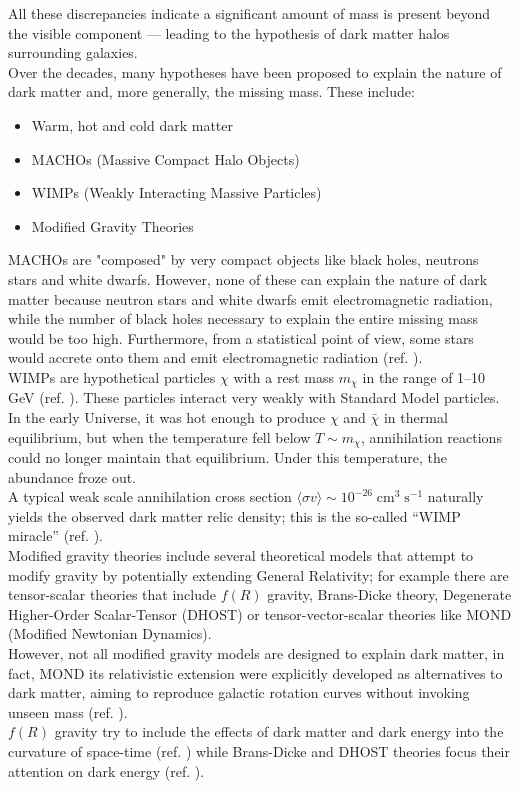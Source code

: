 All these discrepancies indicate a significant amount of mass is present beyond the visible component — leading to the hypothesis of dark matter halos surrounding galaxies.\\
Over the decades, many hypotheses have been proposed to explain the nature of dark matter and, more generally, the missing mass. These include:
\begin{itemize}
    \item Warm, hot and cold dark matter
    \item MACHOs (Massive Compact Halo Objects)
    \item WIMPs (Weakly Interacting Massive Particles)
    \item Modified Gravity Theories
\end{itemize}

MACHOs are "composed" by very compact objects like black holes, neutrons stars and white dwarfs. However, none of these can explain the nature of dark matter because neutron stars and white dwarfs emit electromagnetic radiation, while the number of black holes necessary to explain the entire missing mass would be too high. Furthermore, from a statistical point of view, some stars would accrete onto them and emit electromagnetic radiation (ref. \cite{Astrophysics-in-a-Nutshell}).\\
WIMPs are hypothetical particles $\chi$ with a rest mass $m_\chi$ in the range of 1–10 GeV (ref. \cite{Longair}). These particles interact very weakly with Standard Model particles. In the early Universe, it was hot enough to produce $\chi$ and $\bar\chi$ in thermal equilibrium, but when the temperature fell below $T \sim m_\chi$, annihilation reactions could no longer maintain that equilibrium. Under this temperature, the abundance froze out.\\ A typical weak scale annihilation cross section $\langle \sigma v\rangle \sim 10^{-26} \; \text{cm}^3 \; \text{s}^{-1}$ naturally yields the observed dark matter relic density; this is the so-called “WIMP miracle” (ref. \cite{2024darkmatter}).\\
Modified gravity theories include several theoretical models that attempt to modify gravity by potentially extending General Relativity; for example there are tensor-scalar theories that include $f(R)$ gravity, Brans-Dicke theory, Degenerate Higher-Order Scalar-Tensor (DHOST) or tensor-vector-scalar theories like MOND (Modified Newtonian Dynamics).\\
However, not all modified gravity models are designed to explain dark matter, in fact, MOND its relativistic extension were explicitly developed as alternatives to dark matter, aiming to reproduce galactic rotation curves without invoking unseen mass (ref. \cite{Milgrom_1983_MOND}).\\ $f(R)$ gravity try to include the effects of dark matter and dark energy into the curvature of space-time (ref. \cite{Capozziello_2006}) while Brans-Dicke and DHOST theories focus their attention on dark energy (ref. \cite{langlois2018degeneratehigherorderscalartensordhost}).\\

